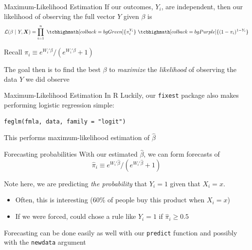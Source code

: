 \documentclass[aspectratio=169,t,11pt,table]{beamer}
\begin{document}
\begin{frame}{Maximum-Likelihood Estimation}
  If our outcomes, $Y_i$, are independent, then our likelihood of observing the full vector $Y$ given $\beta$ is
  $$
    \mathcal{L}(\beta \ \vert \ Y, \bm{X}) = \prod_{i=1}^n 
    \ \tcbhighmath[colback = bgGreen]{\pi_i^{Y_i}} \
    \tcbhighmath[colback = bgPurple]{(1 - \pi_i)^{1 - Y_i}}
  $$

  Recall $\pi_i \equiv e^{W_i'\beta} / ( e^{W_i'\beta} + 1 )$


  \pause
  \bigskip
  The goal then is to find the best $\beta$ to \emph{maximize} the \emph{likelihood} of observing the data $Y$ we did observe
\end{frame}

\begin{frame}{Maximum-Likelihood Estimation In R}
  Luckily, our \texttt{fixest} package also makes performing logistic regression simple: 
  
  \texttt{feglm(fmla, data, family = "logit")}

  This performs maximum-likelihood estimation of $\hat{\beta}$
\end{frame}

\begin{frame}{Forecasting probabilities}
  With our estimated $\hat{\beta}$, we can form forecasts of 
  $$
    \hat{\pi}_i \equiv e^{W_i' \hat{\beta}} / ( e^{W_i' \hat{\beta}} + 1 )
  $$

  \bigskip
  Note here, we are predicting \emph{the probability} that $Y_i = 1$ given that $X_i = x$. 
  \begin{itemize}
    \item Often, this is interesting (60\% of people buy this product when $X_i = x$)
    \item If we were forced, could chose a rule like $\hat{Y}_i = 1$ if $\hat{\pi}_i \geq 0.5$
  \end{itemize}

  \pause
  \bigskip
  Forecasting can be done easily as well with our \texttt{predict} function and possibly with the \texttt{newdata} argument
\end{frame}
\end{document}

